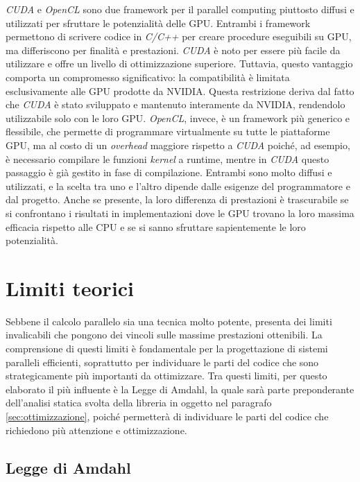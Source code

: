 \textit{CUDA} e \textit{OpenCL} sono due framework per il parallel computing
piuttosto diffusi e utilizzati per sfruttare le potenzialità delle GPU. Entrambi
i framework permettono di scrivere codice in \textit{C/C++} per creare procedure
eseguibili su GPU, ma differiscono per finalità e prestazioni. \textit{CUDA} è noto
per essere più facile da utilizzare e offre un livello di ottimizzazione superiore.
Tuttavia, questo vantaggio comporta un compromesso significativo: la
compatibilità è limitata esclusivamente alle GPU prodotte da NVIDIA. Questa restrizione
deriva dal fatto che \textit{CUDA} è stato sviluppato e mantenuto interamente da
NVIDIA, rendendolo utilizzabile solo con le loro GPU. \textit{OpenCL}, invece, è
un framework più generico e flessibile, che permette di programmare virtualmente
su tutte le piattaforme GPU, ma al costo di un \textit{overhead} maggiore
rispetto a \textit{CUDA} poiché, ad esempio, è necessario compilare le funzioni \textit{kernel}
a runtime, mentre in \textit{CUDA} questo passaggio è già gestito in fase di
compilazione. Entrambi sono molto diffusi e utilizzati, e la scelta tra uno e l'altro
dipende dalle esigenze del programmatore e dal progetto. Anche se presente, la
loro differenza di prestazioni è trascurabile se si confrontano i risultati in
implementazioni dove le GPU trovano la loro massima efficacia rispetto alle CPU
e se si sanno sfruttare sapientemente le loro potenzialità.

\section{Limiti teorici}
\label{sec:limititeorici}

Sebbene il calcolo parallelo sia una tecnica molto potente, presenta dei limiti
invalicabili che pongono dei vincoli sulle massime prestazioni ottenibili. La comprensione
di questi limiti è fondamentale per la progettazione di sistemi paralleli efficienti,
soprattutto per individuare le parti del codice che sono strategicamente più
importanti da ottimizzare. Tra questi limiti, per questo elaborato il più
influente è la Legge di Amdahl, la quale sarà parte preponderante dell'analisi statica
svolta della libreria in oggetto nel paragrafo \ref{sec:ottimizzazione}, poiché
permetterà di individuare le parti del codice che richiedono più attenzione e
ottimizzazione.

\subsection{Legge di Amdahl}
\label{sec:amdahl}

